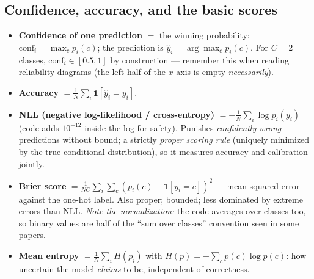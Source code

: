 \documentclass[10pt,a4paper]{article}
\begin{document}
\subsection{Confidence, accuracy, and the basic scores}
\begin{itemize}
\item \textbf{Confidence of one prediction} $=$ the winning probability:
  $\mathrm{conf}_i=\max_c p_i(c)$; the prediction is $\hat y_i=\arg\max_c p_i(c)$.
  For $C=2$ classes, $\mathrm{conf}_i\in[0.5,1]$ by construction --- remember this when reading
  reliability diagrams (the left half of the $x$-axis is empty \emph{necessarily}).
\item \textbf{Accuracy} $=\frac1N\sum_i \mathbf{1}[\hat y_i=y_i]$.
\item \textbf{NLL (negative log-likelihood / cross-entropy)}
  $=-\frac1N\sum_i\log p_i(y_i)$ (code adds $10^{-12}$ inside the log for safety). Punishes
  \emph{confidently wrong} predictions without bound; a strictly \emph{proper scoring rule}
  (uniquely minimized by the true conditional distribution), so it measures accuracy and
  calibration jointly.
\item \textbf{Brier score} $=\frac{1}{NC}\sum_i\sum_c (p_i(c)-\mathbf{1}[y_i=c])^2$ --- mean squared
  error against the one-hot label. Also proper; bounded; less dominated by extreme errors than NLL.
  \emph{Note the normalization:} the code averages over classes too, so binary values are half of
  the ``sum over classes'' convention seen in some papers.
\item \textbf{Mean entropy} $=\frac1N\sum_i H(p_i)$ with $H(p)=-\sum_c p(c)\log p(c)$: how uncertain
  the model \emph{claims} to be, independent of correctness.
\end{itemize}
\end{document}
